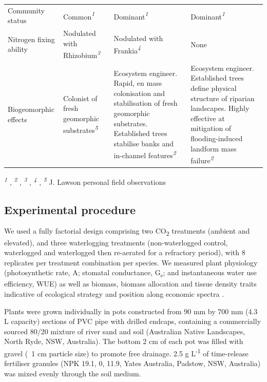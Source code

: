 \documentclass[12pt,a4paper]{memoir}
\begin{document}
\begin{threeparttable}[ht]
\begin{tabularx}{\textwidth}{XXXX}
Community status & Common\textit{\textsuperscript{1}} & Dominant\textit{\textsuperscript{1}} & Dominant\textit{\textsuperscript{1}} \\
Nitrogen fixing ability & Nodulated with Rhizobium\textit{\textsuperscript{3}} & Nodulated with Frankia\textit{\textsuperscript{4}} & None \\
Biogeomorphic effects & Colonist of fresh geomorphic substrates\textit{\textsuperscript{5}} & Ecosystem engineer. Rapid, en mass colonisation and stabilisation of fresh geomorphic substrates. Established trees stabilise banks and in-channel features\textit{\textsuperscript{2}} & Ecosystem engineer. Established trees define physical structure of riparian landscapes. Highly effective at mitigation of flooding-induced landform mass failure\textit{\textsuperscript{2}} \\ \hline
\end{tabularx}
  \begin{tablenotes}
    \item \textit{\textsuperscript{1}} \cite{plantnet}, \textit{\textsuperscript{2}} \cite{Hubble2010}, \textit{\textsuperscript{3}} \cite{roughley1987acacias}, \textit{\textsuperscript{4}} \cite{Dawson1989}, \textit{\textsuperscript{5}} J. Lawson personal field observations
  \end{tablenotes}
\end{threeparttable}

\clearpage

\subsection{Experimental procedure}
We used a fully factorial design comprising two CO\textsubscript{2} treatments (ambient and elevated), and three waterlogging treatments (non-waterlogged control, waterlogged and waterlogged then re-aerated for a refractory period), with 8 replicates per treatment combination per species. We measured plant physiology (photosynthetic rate, A; stomatal conductance, G\textsubscript{s}; and instantaneous water use efficiency, WUE) as well as biomass, biomass allocation and tissue density traits indicative of ecological strategy and position along economic spectra \citep{Reich2014a}.

Plants were grown individually in pots constructed from 90 mm by 700 mm (4.3 L capacity) sections of PVC pipe with drilled endcaps, containing a commercially sourced 80/20 mixture of river sand and soil (Australian Native Landscapes, North Ryde, NSW, Australia). The bottom 2 cm of each pot was filled with gravel (~1 cm particle size) to promote free drainage. 2.5 g L\textsuperscript{-1} of time-release fertiliser granules (NPK 19.1, 0, 11.9, Yates Australia, Padstow, NSW, Australia) was mixed evenly through the soil medium.
\end{document}

